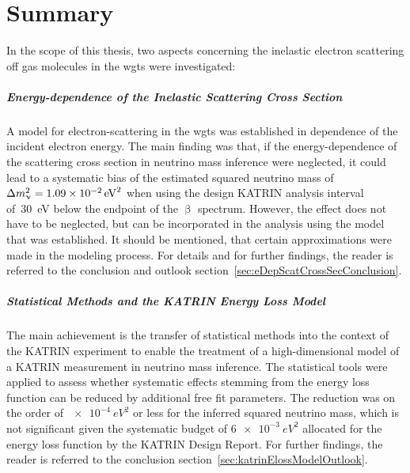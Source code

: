 \chapter{Summary}
\label{sec:conclusion}
In the scope of this thesis, two aspects concerning the inelastic electron scattering off gas molecules in the \gls{wgts} were investigated:

\paragraph{Energy-dependence of the Inelastic Scattering Cross Section}
A model for electron-scattering in the \gls{wgts} was established in dependence of the incident electron energy. The main finding was that, if the energy-dependence of the scattering cross section in neutrino mass inference were neglected, it could lead to a systematic bias of the estimated squared neutrino mass of $\Delta m_\upnu^2 = \SI{1.09e-2}{eV^2}$ when using the design KATRIN analysis interval of~\SI{30}{eV} below the endpoint of the $\upbeta$ spectrum. However, the effect does not have to be neglected, but can be incorporated in the analysis using the model that was established. It should be mentioned, that certain approximations were made in the modeling process. For details and for further findings, the reader is referred to the conclusion and outlook section~\ref{sec:eDepScatCrossSecConclusion}.

\paragraph{Statistical Methods and the KATRIN Energy Loss Model}
The main achievement is the transfer of statistical methods into the context of the KATRIN experiment to enable the treatment of a high-dimensional model of a KATRIN measurement in neutrino mass inference. The statistical tools were applied to assess whether systematic effects stemming from the energy loss function can be reduced by additional free fit parameters. The reduction was on the order of $\SI{e-4}{eV^2}$ or less for the inferred squared neutrino mass, which is not significant given the systematic budget of $\SI{6e-3}{eV^2}$ allocated for the energy loss function by the KATRIN Design Report.
For further findings, the reader is referred to the conclusion section~\ref{sec:katrinElossModelOutlook}.